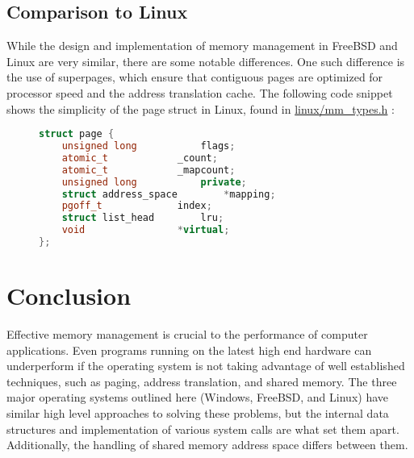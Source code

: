 \documentclass[letterpaper,draftclsnofoot,10pt,onecolumn,titlepage]{IEEEtran}\usepackage[margin=0.75in]{geometry}
\begin{document}
\subsection{Comparison to Linux}
While the design and implementation of memory management in FreeBSD and Linux are very similar, there are 
some notable differences. One such difference is the use of superpages, which ensure that contiguous pages 
are optimized for processor speed and the address translation cache. The following code snippet shows the 
simplicity of the page struct in Linux, found in \url{linux/mm_types.h} \cite{linux}:

\begin{figure}[H]
\begin{lstlisting}[language=C++]
struct page {
	unsigned long 			flags;
	atomic_t			_count;
	atomic_t			_mapcount;
	unsigned long			private;
	struct address_space		*mapping;
	pgoff_t				index;
	struct list_head		lru;
	void				*virtual;
};
\end{lstlisting}
\end{figure}


\section{Conclusion}
Effective memory management is crucial to the performance of computer applications. Even programs 
running on the latest high end hardware can underperform if the operating system is not taking 
advantage of well established techniques, such as paging, address translation, and shared memory.
The three major operating systems outlined here (Windows, FreeBSD, and Linux) have similar high level
approaches to solving these problems, but the internal data structures and implementation of various
system calls are what set them apart. Additionally, the handling of shared memory address space differs
between them.




\end{document}
